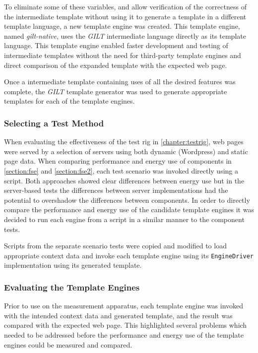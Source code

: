 To eliminate some of these variables, and allow verification of the correctness of the intermediate template without using it to generate a template in a different template language, a new template engine was created. This template engine, named \emph{gilt-native}, uses the \emph{GILT} intermediate language directly as its template language. This template engine enabled faster development and testing of intermediate templates without the need for third-party template engines and direct comparison of the expanded template with the expected web page. 

Once a intermediate template containing uses of all the desired features was complete, the \emph{GILT} template generator was used to generate appropriate templates for each of the template engines.

\subsubsection{Selecting a Test Method}
\label{cce method}

When evaluating the effectiveness of the test rig in \autoref{chapter:testrig}, web pages were served by a selection of servers using both dynamic (Wordpress) and static page data. When comparing performance and energy use of components in \autoref{section:fse} and \autoref{section:fse2}, each test scenario was invoked directly using a script. Both approaches showed clear differences between energy use but in the server-based tests the differences between server implementations had the potential to overshadow the differences between components. In order to directly compare the performance and energy use of the candidate template engines it was decided to run each engine from a script in a similar manner to the component tests.

Scripts from the separate scenario tests were copied and modified to load appropriate context data and invoke each template engine using its \verb!EngineDriver! implementation using its generated template.

\subsubsection{Evaluating the Template Engines}
\label{cce evaluation}

Prior to use on the measurement apparatus, each template engine was invoked with the intended context data and generated template, and the result was compared with the expected web page. This highlighted several problems which needed to be addressed before the performance and energy use of the template engines could be measured and compared.

